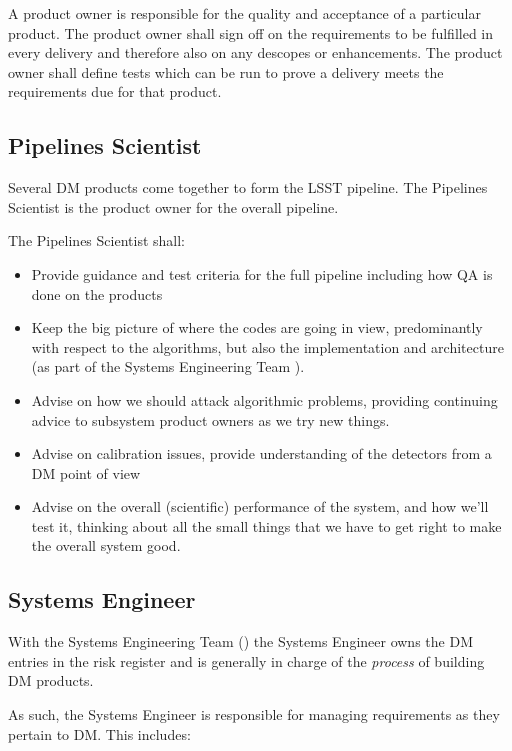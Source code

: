 A product owner is responsible for the quality and acceptance of a particular product.
The product owner shall sign off on the requirements to be fulfilled in every delivery and therefore also on any descopes or enhancements.
The product owner shall define tests which can be run to prove a delivery meets the requirements due for that product.

\subsection{Pipelines Scientist \label{role:pipe}}

Several DM products come together to form the LSST pipeline. The Pipelines Scientist is the product owner for the overall pipeline.

The Pipelines Scientist shall:

\begin{itemize}

\item Provide guidance and test criteria for the full pipeline including how QA is done on the products
\item Keep the big picture of where the codes are going in view, predominantly with respect to the algorithms, but also the implementation and architecture (as part of the Systems Engineering Team ).
\item Advise on how we should attack algorithmic problems, providing continuing advice to subsystem product owners as we try new things.
\item Advise on calibration issues, provide understanding of the detectors from a DM point of view
\item Advise on the overall (scientific) performance of the system, and how we'll test it, thinking about all the small things that we have to get right to make the overall system good.

\end{itemize}

\subsection{Systems Engineer \label{role:sysengineer}}

With the Systems Engineering Team () the Systems Engineer owns the DM entries in the risk register and is generally in charge of the \textit{process} of building DM products.

As such, the Systems Engineer is responsible for managing requirements as they pertain to DM.
This includes:

